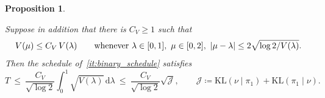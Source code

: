 \documentclass[aos]{imsart}%
\DeclarePairedDelimiter{\abs}{\lvert}{\rvert}
\newcommand{\dd}[0]{\mathrm{d}}
\newcommand{\KL}{\mathrm{KL}}
\theoremstyle{plain}
\newtheorem{proposition}{Proposition}[section]
\theoremstyle{definition}
\begin{document}
\begin{proposition}
\begin{equivcond}
            \item\label{it:binary_horizon_kl}
            Suppose in addition that there is $C_V\geq1$ such that
            \begin{equation}
                \label{eq:binary_reg}
                V(\mu)\leq C_V\,V(\lambda)
                \qquad\text{whenever }\lambda\in[0,1],\ \mu\in[0,2],\
                \abs{\mu-\lambda}\leq2\sqrt{\log2/V(\lambda)} .
            \end{equation}
            Then the schedule of~\ref{it:binary_schedule} satisfies
            \begin{equation}
                \label{eq:binary_T_kl}
                T\ \leq\ \frac{C_V}{\sqrt{\log2}}
                \int_0^{1}\sqrt{V(\lambda)}\,\dd\lambda
                \ \leq\ \frac{C_V}{\sqrt{\log2}}\sqrt{\mathcal{J}},
                \qquad
                \mathcal{J}\coloneq\KL(\nu\mid\pi_1)+\KL(\pi_1\mid\nu).
            \end{equation}
        \end{equivcond}
    \end{proposition}
\end{document}
